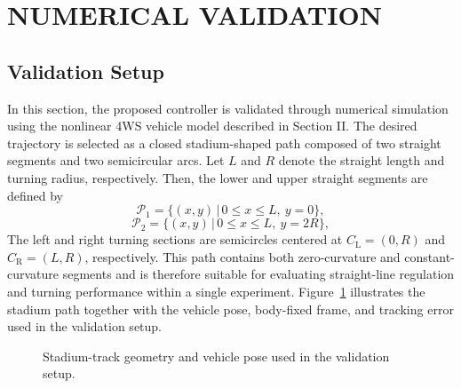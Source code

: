 \documentclass[conference]{IEEEtran}
\begin{document}
\section{NUMERICAL VALIDATION}
\subsection{Validation Setup}
In this section, the proposed controller is validated through numerical simulation using the nonlinear 4WS vehicle model described in Section II. The desired trajectory is selected as a closed stadium-shaped path composed of two straight segments and two semicircular arcs. Let $L$ and $R$ denote the straight length and turning radius, respectively. Then, the lower and upper straight segments are defined by
\begin{equation} \label{eq:stadium_path:upper}
    \mathcal{P}_1 
    = 
    \{(x,y)\,|\,0 \le x \le L,\ y=0\},
\end{equation}
\begin{equation} \label{eq:stadium_path:lower}
    \mathcal{P}_2
     = 
     \{(x,y)\,|\,0 \le x \le L,\ y=2R\}
     ,
\end{equation}
The left and right turning sections are semicircles centered at
$C_{\mathrm{L}}=(0,R)$ and $C_{\mathrm{R}}=(L,R)$, respectively. 
This path contains both zero-curvature and constant-curvature segments 
and is therefore suitable for evaluating straight-line regulation and turning performance within a single experiment. Figure~\ref{fig:stadium-geometry} illustrates the stadium path together with the vehicle pose, body-fixed frame, and tracking error used in the validation setup.

\begin{figure}[!t]
  \centering
  \caption{Stadium-track geometry and vehicle pose used in the validation setup.}
  \label{fig:stadium-geometry}
\end{figure}
\end{document}
